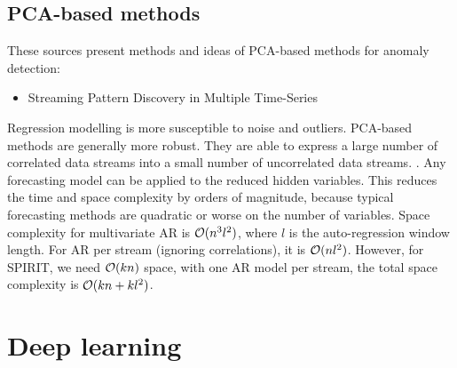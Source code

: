 
\subsection{PCA-based methods} These sources present methods and ideas of PCA-based methods for anomaly detection: 
\begin{itemize}
    \item Streaming Pattern Discovery in Multiple Time-Series \cite{Papadimitriou2005StreamingTime-series}
\end{itemize}

Regression modelling is more susceptible to noise and outliers. PCA-based methods are generally more robust. They are able to express a large number of correlated data streams into a small number of uncorrelated data streams. \cite{Aggarwal2013a}. Any forecasting model can be applied to the reduced hidden variables. This reduces the time and space complexity by orders of magnitude, because typical forecasting methods are quadratic or worse on the number of variables. Space complexity for multivariate AR is $\mathcal{O}{(n^3l^2)}$, where $l$ is the auto-regression window length. For AR per stream (ignoring correlations), it is $\mathcal{O}{(nl^2)}$. However, for SPIRIT, we need $\mathcal{O}{(kn)}$ space, with one AR model per stream, the total space complexity is $\mathcal{O}{(kn+kl^2)}$. \cite{Papadimitriou2005StreamingTime-series}


\section{Deep learning}
